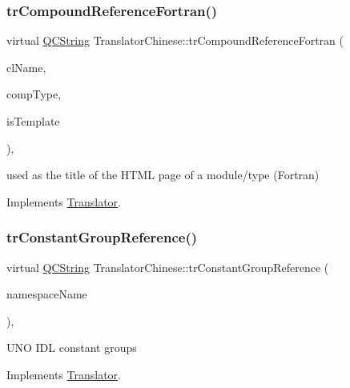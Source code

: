 \subsubsection{\texorpdfstring{trCompoundReferenceFortran()}{trCompoundReferenceFortran()}}
{\footnotesize\ttfamily virtual \mbox{\hyperlink{class_q_c_string}{Q\+C\+String}} Translator\+Chinese\+::tr\+Compound\+Reference\+Fortran (\begin{DoxyParamCaption}\item[{const char $\ast$}]{cl\+Name,  }\item[{\mbox{\hyperlink{class_class_def_ae70cf86d35fe954a94c566fbcfc87939}{Class\+Def\+::\+Compound\+Type}}}]{comp\+Type,  }\item[{bool}]{is\+Template }\end{DoxyParamCaption})\hspace{0.3cm}{\ttfamily [inline]}, {\ttfamily [virtual]}}

used as the title of the H\+T\+ML page of a module/type (Fortran) 

Implements \mbox{\hyperlink{class_translator}{Translator}}.

\mbox{\label{class_translator_chinese_aa97e586e644632b27b2e671834171bac}} 
\subsubsection{\texorpdfstring{trConstantGroupReference()}{trConstantGroupReference()}}
{\footnotesize\ttfamily virtual \mbox{\hyperlink{class_q_c_string}{Q\+C\+String}} Translator\+Chinese\+::tr\+Constant\+Group\+Reference (\begin{DoxyParamCaption}\item[{const char $\ast$}]{namespace\+Name }\end{DoxyParamCaption})\hspace{0.3cm}{\ttfamily [inline]}, {\ttfamily [virtual]}}

U\+NO I\+DL constant groups 

Implements \mbox{\hyperlink{class_translator}{Translator}}.

\mbox{\label{class_translator_chinese_a73e86493a6caff2f52c9d82a2ffaab84}} 
